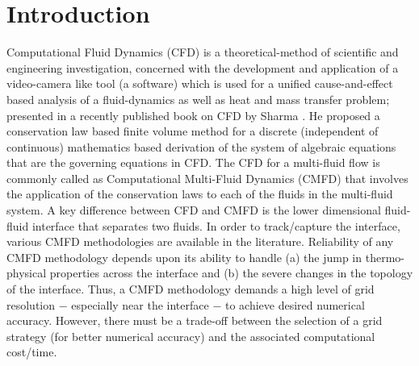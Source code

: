 \documentclass[preprint,12pt]{elsarticle}
\begin{document}




\section{Introduction}\label{intro}

Computational Fluid Dynamics (CFD) is a theoretical-method of scientific
and engineering investigation, concerned with the development and
application of a video-camera like tool (a software) which is used
for a unified cause-and-effect based analysis of a fluid-dynamics
as well as heat and mass transfer problem; presented in a recently
published book on CFD by Sharma \cite{Sharma2017}.  He proposed a conservation
law based finite volume method for a discrete (independent of continuous)
mathematics based derivation of the system of algebraic equations that
are the governing equations in CFD.   The CFD for a multi-fluid flow
is commonly called as Computational Multi-Fluid Dynamics (CMFD) that
involves the application of the conservation laws to each  of the fluids
in the multi-fluid system. A key difference between  CFD and CMFD
 is the lower dimensional fluid-fluid interface that separates two fluids.
In order to track/capture the interface, various CMFD methodologies
are available in the literature. Reliability of any CMFD methodology
depends upon  its ability to handle (a) the jump in thermo-physical
properties across the interface and (b) the severe changes in the
topology of the interface. Thus, a CMFD methodology demands a high level
of grid resolution $-$ especially near the interface $-$ to achieve
desired numerical accuracy. However, there must be a trade-off between
the selection of a grid strategy (for better numerical accuracy) and
the associated computational cost/time.
\end{document}
